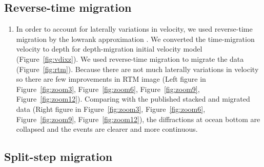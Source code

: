 \begin{comment}
\subsection{Kirchhoff post-stack time migration}

\begin{enumerate}

\item We used Kirchhoff post-stack time migration to migrate the data (Figure~\ref{fig:kmig}).

\plot{kmig}{width=0.8\textwidth}{Kirchhoff post-stack time migration.} 

\end{enumerate}
\end{comment}

\subsection{Reverse-time migration}

\begin{enumerate}

\item In order to account for laterally variations in velocity, we used reverse-time migration by the lowrank approximation \cite[]{lowrank}. We converted the time-migration velocity to depth for depth-migration initial velocity model (Figure~\ref{fig:vdixz}). We used reverse-time migration to migrate the data (Figure~\ref{fig:rtm}). Because there are not much laterally variations in velocity so there are few improvements in RTM image (Left figure in Figure~\ref{fig:zoom3}, Figure~\ref{fig:zoom6}, Figure~\ref{fig:zoom9}, Figure~\ref{fig:zoom12}). Comparing with the published stacked and migrated data (Right figure in Figure~\ref{fig:zoom3}, Figure~\ref{fig:zoom6}, Figure~\ref{fig:zoom9}, Figure~\ref{fig:zoom12}), the diffractions at ocean bottom are collapsed and the events are clearer and more continuous.          


\end{enumerate}\clearpage

\subsection{Split-step migration}

